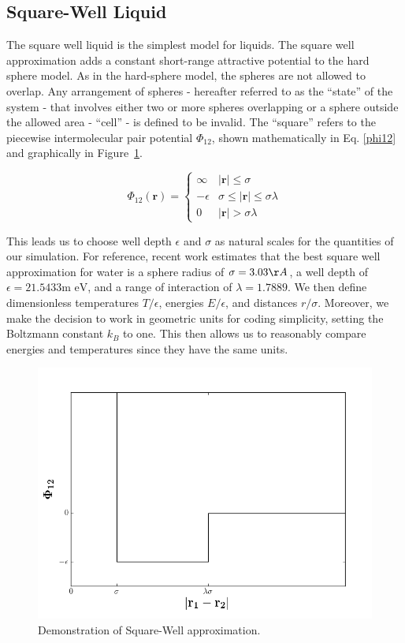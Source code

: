 \documentclass[12pt]{article}
\renewcommand{\vec}[1]{\mathbf{#1}}
\begin{document}
\subsection{Square-Well Liquid}
The square well liquid is the simplest model for liquids\cite{theorysimpleliquids}. The square well approximation adds a constant short-range attractive potential to the hard sphere model. As in the hard-sphere model, the spheres are not allowed to overlap. Any arrangement of spheres - hereafter referred to as the ``state'' of the system - that involves either two or more spheres overlapping or a sphere outside the allowed area - ``cell'' - is defined to be invalid. The ``square'' refers to the piecewise intermolecular pair potential $\Phi_{12}$, shown mathematically in Eq. \ref{phi12} and graphically in Figure~\ref{sw_phi}.

\begin{equation} 
\Phi_{12}(\vec{r}) = \begin{cases}\infty & |\vec{r}|\leq \sigma\\ -\epsilon & \sigma \leq |\vec{r}| \leq \sigma\lambda\\ 0 & |\vec{r}| > \sigma\lambda \end{cases}
\label{phi12}
\end{equation}

This leads us to choose well depth $\epsilon$ and $\sigma$ as natural scales for the quantities of our simulation. For reference, recent\cite{clarkwater} work estimates that the best square well approximation for water is a sphere radius of $\sigma = 3.03 \AA$, a well depth of $\epsilon = 21.5433 \text{m eV}$, and a range of interaction of $\lambda = 1.7889$. We then define dimensionless temperatures $T/\epsilon$, energies $E/\epsilon$, and distances $r/\sigma$. Moreover, we make the decision to work in geometric units for coding simplicity, setting the Boltzmann constant $k_B$ to one. This then allows us to reasonably compare energies and temperatures since they have the same units.

\begin{figure}
    \centering
    \includegraphics[width=.75\textwidth]{SWF-E.png}
    \caption{Demonstration of Square-Well approximation.}
    \label{sw_phi}
\end{figure}
\end{document}
